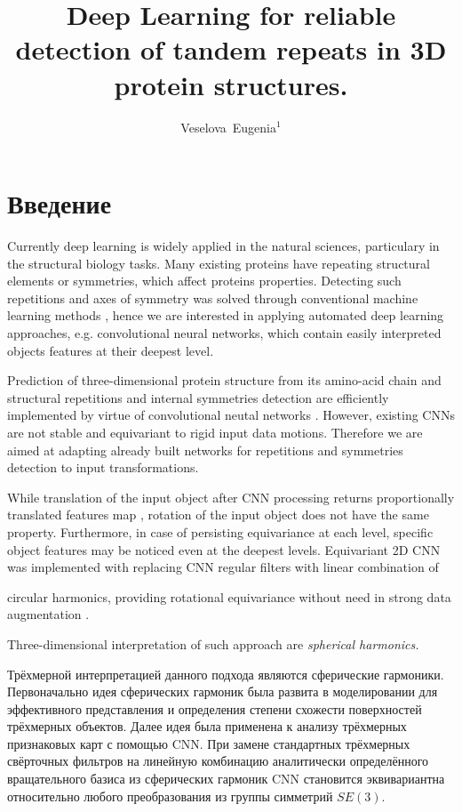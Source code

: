 \documentclass[12pt,twosides]{article}
\title
[Detection of tandem repeats in proteins]
{Deep Learning for reliable detection of tandem repeats in 3D protein structures.}
\author
[Veselova~Eugenia] 
{Veselova~Eugenia$^1$}
\begin{document}
	\maketitle
	
	\section{Введение}
	Currently deep learning is widely applied in the natural sciences, particulary in the structural biology tasks. Many existing proteins have repeating structural elements or symmetries, which affect proteins properties. Detecting such repetitions and axes of symmetry was solved through conventional machine learning methods \cite{MitGuiPau06}, hence we are interested in applying automated deep learning approaches, e.g. convolutional neural networks, which contain easily interpreted objects features at their deepest level.

	Prediction of three-dimensional protein structure from its amino-acid chain \cite{BioCNN18} and structural repetitions and internal symmetries detection are efficiently implemented by virtue of convolutional neutal networks \cite{DeepSymmetry18}. However, existing CNNs are not stable and equivariant to rigid input data motions. Therefore we are aimed at adapting already built networks for repetitions and symmetries detection to input transformations.
	
	While translation of the input object after CNN processing returns proportionally translated features map \cite{Lenc18}, rotation of the input object does not have the same property. Furthermore, in case of persisting equivariance at each level, specific object features may be noticed even at the deepest levels. Equivariant 2D CNN was implemented with replacing CNN regular filters with linear combination of \item{circular harmonics}, providing rotational equivariance without need in strong data augmentation \cite{conf/cvpr/WorrallGTB17}. 
	
	Three-dimensional interpretation of such approach are \it{spherical harmonics}.
	
	 Трёхмерной интерпретацией данного подхода являются сферические гармоники. Первоначально идея сферических гармоник была развита в моделировании для эффективного представления и определения степени схожести поверхностей трёхмерных объектов\cite{conf/siggraph/KazhdanF02, journals/cagd/MousaCAG08}. Далее идея была применена к анализу трёхмерных признаковых карт с помощью CNN. При замене стандартных трёхмерных свёрточных фильтров на линейную комбинацию аналитически определённого вращательного базиса из сферических гармоник CNN становится эквивариантна относительно любого преобразования из группы симметрий $SE(3)$\cite{DBLP:journals/corr/abs-1807-02547}.
	
\end{document}
